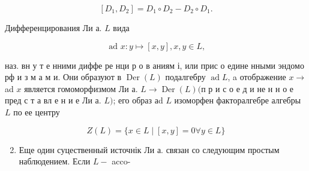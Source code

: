 \documentclass[10pt]{article}
\begin{document}
\[

\left[D_{1}, D_{2}\right]=D_{1} \circ D_{2}-D_{2} \circ D_{1} .

\]



Дифференцирования Ли а. $L$ вида



\[

\text { ad } x: y \longmapsto[x, y], x, y \in L,

\]



наз. вн у т е нними диффе ре нци р о в аниям і, или прис о едине нными эндомо рф и з м а м и. Они образуют в $\operatorname{Der}(L)$ подалгебру $\operatorname{ad} L$, a отображение $x \rightarrow$ ad $x$ является гомоморфизмом Ли а. $L \rightarrow \operatorname{Der}(L)(п$ р и с о е д и не н н о е пред с т а вл е н и е Ли а. $L)$; его образ аd $L$ изоморфен факторалгебре алгебры $L$ по ее центру



\[

Z(L)=\{x \in L \mid[x, y]=0 \forall y \in L\}

\]



\begin{enumerate}

  \setcounter{enumi}{1}

  \item Еще один суцественный источнік Ли а. связан со следующим простым наблюдением. Если $L-$ acco-

\end{enumerate}
\end{document}
